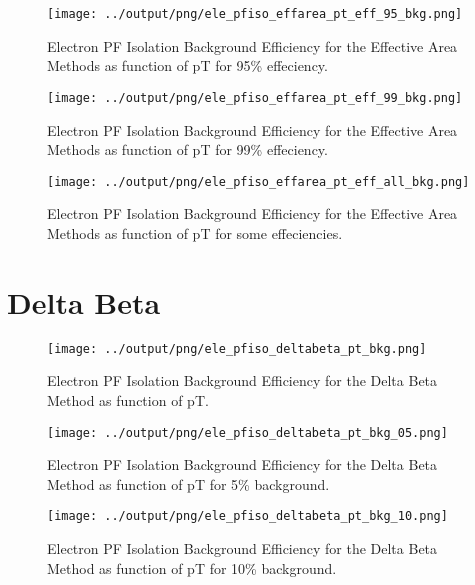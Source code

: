 \documentclass[11pt]{book}
\begin{document}
\begin{figure}[htb]
\centering
\texttt{[image: ../output/png/ele\_pfiso\_effarea\_pt\_eff\_95\_bkg.png]}
\caption{Electron PF Isolation Background Efficiency for the Effective Area Methods as function of pT for 95\% effeciency.}
\label{fig:ele_pfiso_pt_eff_effarea_eff_95_bkg}
\end{figure}

\begin{figure}[htb]
\centering
\texttt{[image: ../output/png/ele\_pfiso\_effarea\_pt\_eff\_99\_bkg.png]}
\caption{Electron PF Isolation Background Efficiency for the Effective Area Methods as function of pT for 99\% effeciency.}
\label{fig:ele_pfiso_pt_eff_effarea_eff_99_bkg}
\end{figure}

\begin{figure}[htb]
\centering
\texttt{[image: ../output/png/ele\_pfiso\_effarea\_pt\_eff\_all\_bkg.png]}
\caption{Electron PF Isolation Background Efficiency for the Effective Area Methods as function of pT for some effeciencies.}
\label{fig:ele_pfiso_pt_eff_effarea_eff_all_bkg}
\end{figure}
\clearpage

\section{Delta Beta}
\begin{figure}[htb]
\centering
\texttt{[image: ../output/png/ele\_pfiso\_deltabeta\_pt\_bkg.png]}
\caption{Electron PF Isolation Background Efficiency for the Delta Beta Method as function of pT.}
\label{fig:ele_pfiso_pt_bkg_deltabeta}
\end{figure}

\begin{figure}[htb]
\centering
\texttt{[image: ../output/png/ele\_pfiso\_deltabeta\_pt\_bkg\_05.png]}
\caption{Electron PF Isolation Background Efficiency for the Delta Beta Method as function of pT for 5\% background.}
\label{fig:ele_pfiso_pt_bkg_deltabeta_bkg_05}
\end{figure}

\begin{figure}[htb]
\centering
\texttt{[image: ../output/png/ele\_pfiso\_deltabeta\_pt\_bkg\_10.png]}
\caption{Electron PF Isolation Background Efficiency for the Delta Beta Method as function of pT for 10\% background.}
\label{fig:ele_pfiso_pt_bkg_deltabeta_bkg_10}
\end{figure}
\end{document}
